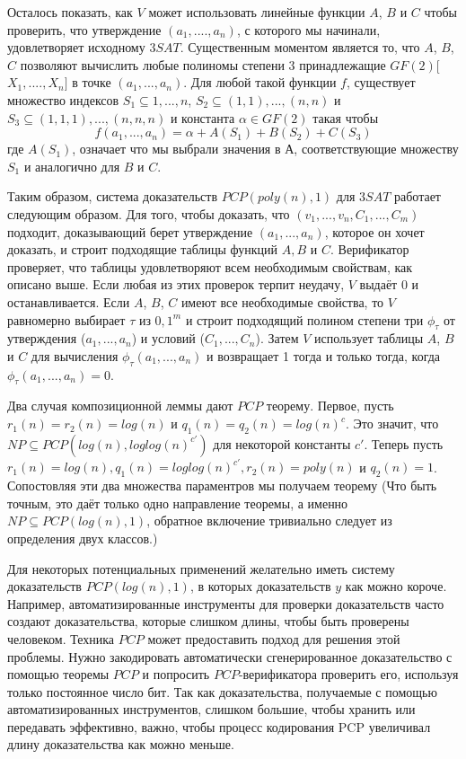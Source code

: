 \documentclass{article}
\newcommand{\blank} {
\newline
\newline
}
\theoremstyle{definition}
\begin{document}
\blank
Осталось показать, как $V$ может использовать линейные функции $A$, $B$ и $C$ чтобы проверить, что утверждение $(a_1,...., a_n)$, с которого мы начинали, удовлетворяет исходному $3SAT$. Существенным моментом является то, что $A$, $B$, $C$ позволяют вычислить любые полиномы степени 3 принадлежащие $GF(2)$[$X_1,....,X_n]$ в точке $(a_1, ..., a_n)$. Для любой такой функции $f$, существует множество индексов $S_1 \subseteq {1, ..., n}$, $S_2 \subseteq {(1,1), ..., (n,n)}$ и $S_3 \subseteq {(1,1,1), ..., (n,n,n)}$ и константа $\alpha \in GF(2)$ такая чтобы
$$f(a_1, ..., a_n) = \alpha + A(S_1) + B(S_2) + C(S_3)$$ где $A(S_1)$, означает что мы выбрали значения в А, соответствующие множеству $S_1$ и аналогично для $B$ и $C$.
\blank
Таким образом, система доказательств $PCP(poly(n), 1)$ для $3SAT$ работает следующим образом. Для того, чтобы доказать, что $({v_1, ..., v_n}, {C_1, ..., C_m})$ подходит, доказывающий берет утверждение $(a_1,..., a_n)$, которое он хочет доказать, и строит подходящие таблицы функций $A, B$ и $C$. Верификатор проверяет, что таблицы удовлетворяют всем необходимым свойствам, как описано выше. Если любая из этих проверок терпит неудачу, $V$ выдаёт 0 и останавливается. Если $A$, $B$, $C$ имеют все необходимые свойства, то $V$ равномерно выбирает $\tau$ из ${0,1}^m$ и строит подходящий полином степени три $\phi_{\tau}$ от утверждения ({$a_1, ..., a_n$}) и условий ({$C_1, ..., C_n$}). Затем $V$ использует таблицы $A$, $B$ и $C$ для вычисления $\phi_{\tau}(a_1, ...,a_n)$ и возвращает 1 тогда и только тогда, когда $\phi_{\tau}(a_1, ...,a_n) = 0$.
\blank
Два случая композиционной леммы дают $PCP$ теорему. Первое, пусть $r_1(n) = r_2(n) = log(n)$ и $q_1(n) = q_2(n) = log(n)^c$. Это значит, что $NP \subseteq PCP(log(n), loglog(n)^{c'})$ для некоторой константы $c'$. Теперь пусть $r_1(n) = log(n), q_1(n) = loglog(n)^{c'}, r_2(n) = poly(n)$ и $q_2(n) = 1$. Сопостовляя эти два множества параментров мы получаем теорему (Что быть точным, это даёт только одно направление теоремы, а именно $NP \subseteq PCP(log(n), 1)$, обратное включение тривиально следует из определения двух классов.)
\blank
Для некоторых потенциальных применений желательно иметь систему доказательств $PCP(log(n), 1)$, в которых доказательств $y$ как можно короче. Например, автоматизированные инструменты для проверки доказательств часто создают доказательства, которые слишком длины, чтобы быть проверены человеком. Техника $PCP$ может предоставить подход для решения этой проблемы. Нужно закодировать автоматически сгенерированное доказательство с помощью теоремы $PCP$ и попросить $PCP$-верификатора проверить его, используя только постоянное число бит. Так как доказательства, получаемые с помощью автоматизированных инструментов, слишком большие, чтобы хранить или передавать эффективно, важно, чтобы процесс кодирования PCP увеличивал длину доказательства как можно меньше.
\end{document}

